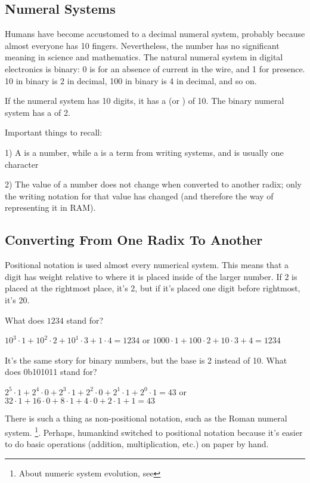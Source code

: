 \subsection{Numeral Systems}

Humans have become accustomed to a decimal numeral system, probably because almost everyone has 10 fingers.
Nevertheless, the number  has no significant meaning in science and mathematics.
The natural numeral system in digital electronics is binary: 0 is for an absence of current in the wire, and 1 for presence.
10 in binary is 2 in decimal, 100 in binary is 4 in decimal, and so on.

If the numeral system has 10 digits, it has a  (or ) of 10.
The binary numeral system has a  of 2.

Important things to recall:

1) A  is a number, while a  is a term from writing systems, and is usually one character

2) The value of a number does not change when converted to another radix; only the writing notation for that value has changed (and therefore the way of representing it in \ac{RAM}).

\subsection{Converting From One Radix To Another}

Positional notation is used almost every numerical system. This means that a digit has weight relative to where it is placed inside of the larger number.
If 2 is placed at the rightmost place, it's 2, but if it's placed one digit before rightmost, it's 20.

What does $1234$ stand for?

$10^3 \cdot 1 + 10^2 \cdot 2 + 10^1 \cdot 3 + 1 \cdot 4 = 1234$ or
$1000 \cdot 1 + 100 \cdot 2 + 10 \cdot 3 + 4 = 1234$

It's the same story for binary numbers, but the base is 2 instead of 10.
What does 0b101011 stand for?

$2^5 \cdot 1 + 2^4 \cdot 0 + 2^3 \cdot 1 + 2^2 \cdot 0 + 2^1 \cdot 1 + 2^0 \cdot 1 = 43$ or
$32 \cdot 1 + 16 \cdot 0 + 8 \cdot 1 + 4 \cdot 0 + 2 \cdot 1 + 1 = 43$

There is such a thing as non-positional notation, such as the Roman numeral system.
\footnote{About numeric system evolution, see }.
Perhaps, humankind switched to positional notation because it's easier to do basic operations (addition, multiplication, etc.) on paper by hand.

